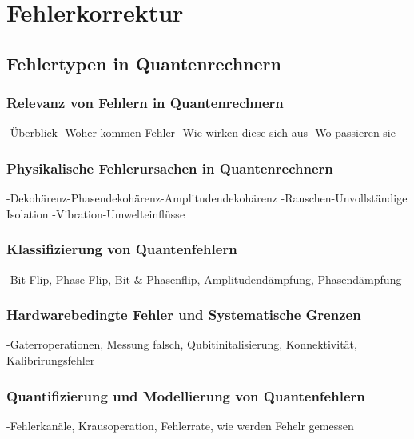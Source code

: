 \chapter{Fehlerkorrektur}
\label{error_correction} %



\section{Fehlertypen in Quantenrechnern}

\subsection{Relevanz von Fehlern in Quantenrechnern}
{-Überblick }
{-Woher kommen Fehler}
{-Wie wirken diese sich aus}
{-Wo passieren sie}

\subsection{Physikalische Fehlerursachen in Quantenrechnern}
{-Dekohärenz-Phasendekohärenz-Amplitudendekohärenz -Rauschen-Unvollständige Isolation -Vibration-Umwelteinflüsse}

\subsection{Klassifizierung von Quantenfehlern}
{-Bit-Flip,-Phase-Flip,-Bit & Phasenflip,-Amplitudendämpfung,-Phasendämpfung}

\subsection{Hardwarebedingte Fehler und Systematische Grenzen}
{-Gaterroperationen, Messung falsch, Qubitinitalisierung, Konnektivität, Kalibrirungsfehler}

\subsection{Quantifizierung und Modellierung von Quantenfehlern}
{-Fehlerkanäle, Krausoperation, Fehlerrate, wie werden Fehelr gemessen}

